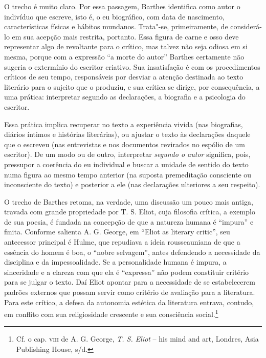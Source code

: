 O trecho é muito claro. Por essa passagem, Barthes identifica como autor
o indivíduo que escreve, isto é, o eu biográfico, com data de
nascimento, características físicas e hábitos mundanos. Trata"-se,
primeiramente, de considerá-lo em sua acepção mais restrita, portanto.
Essa figura de carne e osso deve representar algo de revoltante para o
crítico, mas talvez não seja odiosa em si mesma, porque com a expressão
``a morte do autor'' Barthes certamente não sugeria o extermínio do
escritor criativo. Sua insatisfação é com os procedimentos críticos de
seu tempo, responsáveis por desviar a atenção destinada ao texto
literário para o sujeito que o produziu, e sua crítica se dirige, por
consequência, a uma prática: interpretar segundo as declarações, a
biografia e a psicologia do escritor.

Essa prática implica recuperar no texto a experiência vivida (nas
biografias, diários íntimos e histórias literárias), ou ajustar o texto
às declarações daquele que o escreveu (nas entrevistas e nos documentos
revirados no espólio de um escritor). De um modo ou de outro,
interpretar \emph{segundo o autor} significa, pois, pressupor a coerência do eu
individual e buscar a unidade de sentido do texto numa figura ao mesmo
tempo anterior (na suposta premeditação consciente ou inconsciente do
texto) e posterior a ele (nas declarações ulteriores a seu respeito).

O trecho de Barthes retoma, na verdade, uma discussão um pouco mais
antiga, travada com grande propriedade por T. S. Eliot, cuja filosofia
crítica, a exemplo de sua poesia, é fundada na concepção de que a
natureza humana é ``impura'' e finita. Conforme salienta A. G. George,
em ``Eliot as literary critic'', seu antecessor principal é Hulme, que
repudiava a ideia rousseauniana de que a essência do homem é boa, o
``nobre selvagem'', antes defendendo a necessidade da disciplina e da
impessoalidade. Se a personalidade humana é impura, a sinceridade e a
clareza com que ela é ``expressa'' não podem constituir critério para se
julgar o texto. Daí Eliot apontar para a necessidade de se estabelecerem
padrões externos que possam servir como critério de avaliação para a
literatura. Para este crítico, a defesa da autonomia estética da
literatura entrava, contudo, em conflito com sua religiosidade crescente
e sua consciência social.\footnote{Cf. o cap. \textsc{viii} de A. G.
  George, \emph{T. S. Eliot} -- his mind and art, Londres, Asia
  Publishing House, s/d.}


